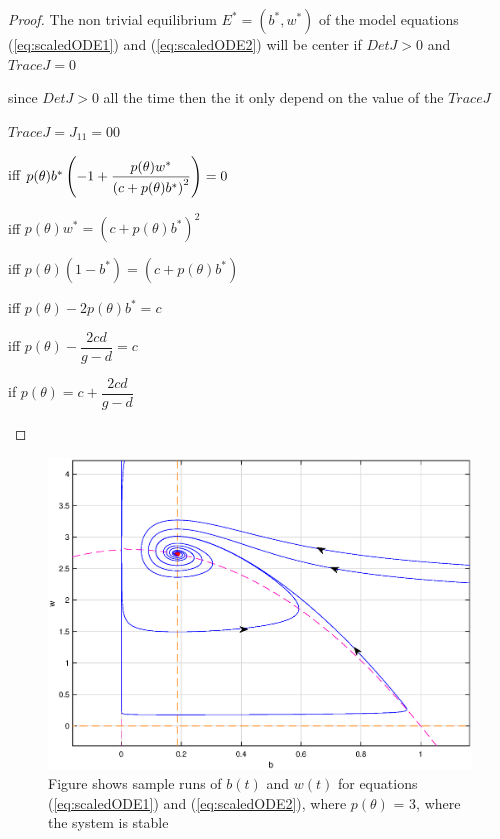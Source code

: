 \documentclass[12pt]{article}
\begin{document}
\begin{proof}
  The non trivial equilibrium $E^{\ast }=(b^{\ast },w^{\ast })$ of the
  model equations (\ref{eq:scaledODE1}) and (\ref{eq:scaledODE2}) will
  be center if $DetJ>0$ and $TraceJ=0$

since $DetJ>0$ all the time then the it only depend on the value of the $%
TraceJ$
\begin{center}
$TraceJ=J_{11}=00$

iff $p(\theta )b^{\ast }\left( -1+\dfrac{p(\theta )w^{\ast }}{%
\left( c+p(\theta )b^{\ast }\right) ^{2}}\right) =0$

iff $p(\theta )w^{\ast }=\left( c+p(\theta )b^{\ast }\right)
^{2} $

iff $p(\theta )\left( 1-b^{\ast }\right) =\left( c+p(\theta
)b^{\ast }\right) $

iff $p(\theta )-2p(\theta )b^{\ast }=c$

iff $p(\theta )-\dfrac{2cd}{g-d}=c$

if $p(\theta )=c+\dfrac{2cd}{g-d}$
\end{center}

\end{proof}
\begin{figure}[!htp]
\begin{center}
\includegraphics[scale=0.3]{img/s.eps}  

\end{center}

\caption{Figure shows sample runs of $b(t)$ and $w(t)$ for equations
  (\ref{eq:scaledODE1}) and (\ref{eq:scaledODE2}), where
  $p(\theta )$ = 3, where the system is stable }
      \label{fig:S}
\end{figure}
\end{document}
